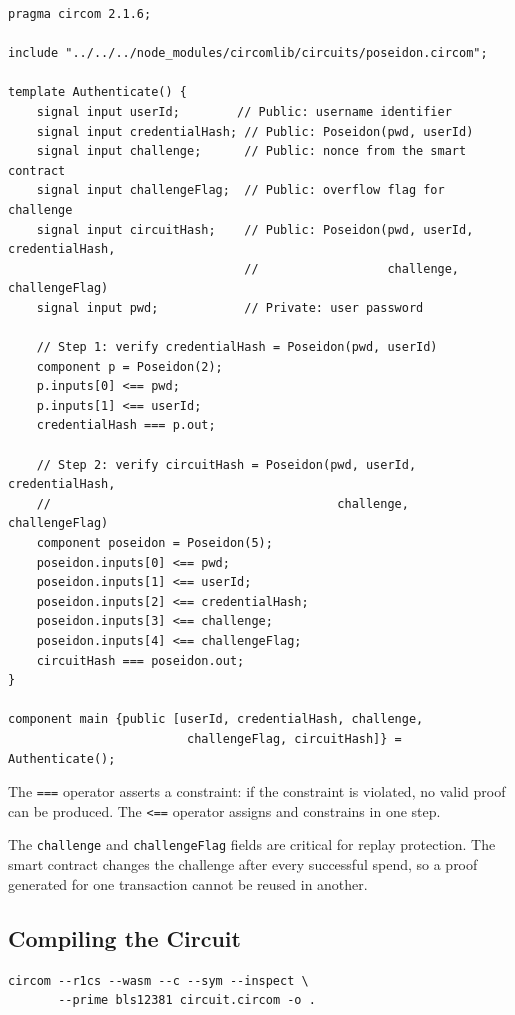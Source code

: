 \begin{verbatim}
pragma circom 2.1.6;

include "../../../node_modules/circomlib/circuits/poseidon.circom";

template Authenticate() {
    signal input userId;        // Public: username identifier
    signal input credentialHash; // Public: Poseidon(pwd, userId)
    signal input challenge;      // Public: nonce from the smart contract
    signal input challengeFlag;  // Public: overflow flag for challenge
    signal input circuitHash;    // Public: Poseidon(pwd, userId, credentialHash,
                                 //                  challenge, challengeFlag)
    signal input pwd;            // Private: user password

    // Step 1: verify credentialHash = Poseidon(pwd, userId)
    component p = Poseidon(2);
    p.inputs[0] <== pwd;
    p.inputs[1] <== userId;
    credentialHash === p.out;

    // Step 2: verify circuitHash = Poseidon(pwd, userId, credentialHash,
    //                                        challenge, challengeFlag)
    component poseidon = Poseidon(5);
    poseidon.inputs[0] <== pwd;
    poseidon.inputs[1] <== userId;
    poseidon.inputs[2] <== credentialHash;
    poseidon.inputs[3] <== challenge;
    poseidon.inputs[4] <== challengeFlag;
    circuitHash === poseidon.out;
}

component main {public [userId, credentialHash, challenge,
                         challengeFlag, circuitHash]} = Authenticate();
\end{verbatim}

The \texttt{===} operator asserts a constraint: if the constraint is violated, no valid proof can be produced. The \texttt{<==} operator assigns and constrains in one step.

The \texttt{challenge} and \texttt{challengeFlag} fields are critical for replay protection. The smart contract changes the challenge after every successful spend, so a proof generated for one transaction cannot be reused in another.

\subsection*{Compiling the Circuit}

\begin{verbatim}
circom --r1cs --wasm --c --sym --inspect \
       --prime bls12381 circuit.circom -o .
\end{verbatim}

